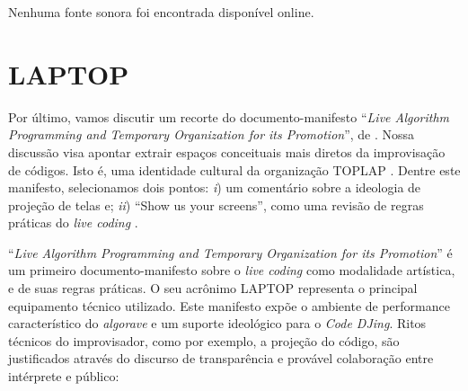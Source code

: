 Nenhuma fonte sonora foi encontrada disponível online. 

\section{LAPTOP}\label{sec:laptoptoplap}

Por último, vamos discutir um recorte do documento-manifesto ``\emph{Live Algorithm Programming and Temporary Organization for its Promotion}'', de . Nossa discussão visa apontar extrair espaços conceituais mais diretos da improvisação de códigos. Isto é, uma identidade cultural da organização TOPLAP .  Dentre este manifesto, selecionamos dois pontos: \emph{i}) um comentário sobre a ideologia de projeção de telas  e; \emph{ii}) ``Show us your screens'', como uma revisão de regras práticas do \emph{live coding} .

``\emph{Live Algorithm Programming and Temporary Organization for its Promotion}'' \cite{ward_live_2004,blackwell_programming_2005} é um primeiro documento-manifesto sobre o \emph{live coding} como modalidade artística, e de suas regras práticas. O seu acrônimo LAPTOP representa o principal equipamento técnico utilizado. Este manifesto expõe o ambiente de performance característico do \emph{algorave} e um suporte ideológico para o \emph{Code DJing}. Ritos técnicos do improvisador, como por exemplo, a projeção do código, são justificados através do discurso de transparência e provável colaboração entre intérprete e público:

